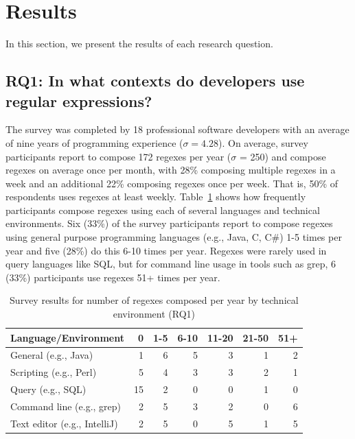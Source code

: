 \section{Results}
\label{sec:results}



In this section, we present the results of each research question.

\subsection{RQ1: In what contexts do developers use regular expressions?}
\label{rq1:survey}

The survey was completed by 18 professional software developers with an average of nine years of programming experience ($\sigma = 4.28$).
On average, survey participants report to compose 172 regexes per year ($\sigma$ = 250) and compose regexes on average once per month, with 28\% composing multiple regexes in a week and an additional 22\% composing regexes once per week. That is, 50\% of respondents uses regexes at least weekly.
Table~\ref{tab:regexenviron} shows how frequently participants compose regexes using each of several languages and technical environments.
Six (33\%) of the survey participants report to compose regexes using general purpose programming languages (e.g., Java, C, C\#) 1-5 times per year and five (28\%) do this 6-10 times per year.  Regexes were rarely used in query languages like SQL, but for command line usage in tools such as grep, 6 (33\%) participants use regexes 51+ times per year.

\newcommand{\horiz}{\hspace{2.1pt}}

\begin{table}
\caption{Survey results for number of regexes composed per year by technical environment (RQ1) \label{tab:regexenviron}}
\begin{center}
\begin{small}
\begin{tabular}{l | r @{  \horiz} r @{ \horiz } r @{ \horiz } r @{ \horiz } r @{ \horiz } r }
\toprule
\textbf{Language/Environment} & 0 & 1-5 & 6-10 & 11-20 & 21-50 & 51+ \\  \hline \bigstrut
General  (e.g., Java)  & 1 & 6 & 5 & 3& 1& 2 \\ \hline \bigstrut
Scripting  (e.g., Perl) &5 &4 &3 &3 &2  &1 \\ \hline \bigstrut
Query  (e.g., SQL) & 15&2 &0 &0 &1  & 0\\ \hline \bigstrut
Command line (e.g., grep)   &2 &5 &3 &2 &0  &6 \\ \hline \bigstrut
Text editor (e.g., IntelliJ)   & 2& 5& 0& 5& 1& 5\\
\bottomrule
\end{tabular}
\end{small}
\end{center}
\end{table}

